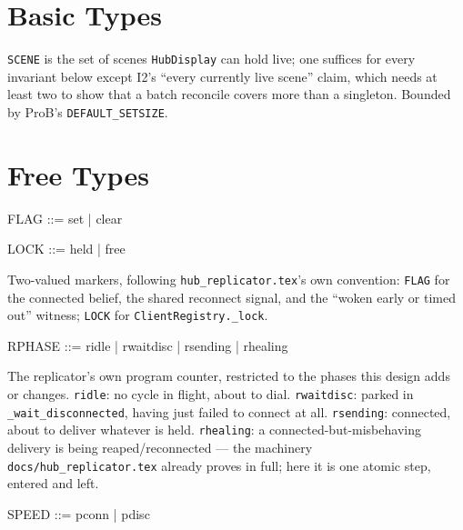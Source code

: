 \documentclass[a4paper,10pt,fleqn]{article}
\begin{document}
\section{Basic Types}

\begin{zed}
  [SCENE]
\end{zed}

\texttt{SCENE} is the set of scenes \texttt{HubDisplay} can hold live; one
suffices for every invariant below except I2's ``every currently live
scene'' claim, which needs at least two to show that a batch reconcile
covers more than a singleton.  Bounded by ProB's \texttt{DEFAULT\_SETSIZE}.

\section{Free Types}

\begin{zed}
  FLAG ::= set | clear
\end{zed}

\begin{zed}
  LOCK ::= held | free
\end{zed}

Two-valued markers, following \texttt{hub\_replicator.tex}'s own convention:
\texttt{FLAG} for the connected belief, the shared reconnect signal, and the
``woken early or timed out'' witness; \texttt{LOCK} for
\texttt{ClientRegistry.\_lock}.

\begin{zed}
  RPHASE ::= ridle | rwaitdisc | rsending | rhealing
\end{zed}

The replicator's own program counter, restricted to the phases this design
adds or changes.  \texttt{ridle}: no cycle in flight, about to dial.
\texttt{rwaitdisc}: parked in \texttt{\_wait\_disconnected}, having just
failed to connect at all.  \texttt{rsending}: connected, about to deliver
whatever is held.  \texttt{rhealing}: a connected-but-misbehaving delivery
is being reaped/reconnected --- the machinery
\texttt{docs/hub\_replicator.tex} already proves in full; here it is one
atomic step, entered and left.

\begin{zed}
  SPEED ::= pconn | pdisc
\end{zed}
\end{document}
